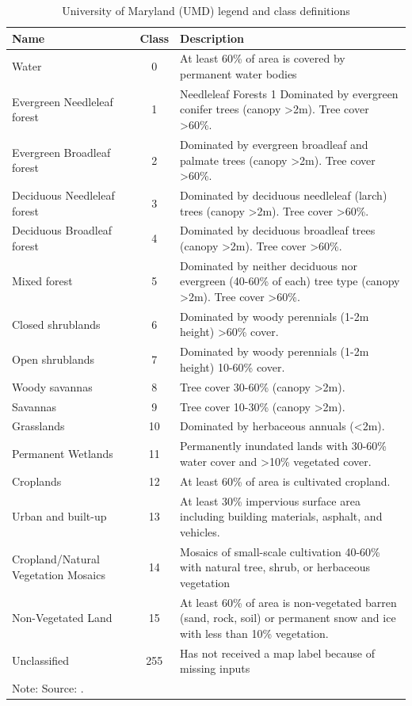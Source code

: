 \begin{table}[H]
\footnotesize
\caption{University of Maryland (UMD) legend and class definitions}
\begin{tabularx}{\textwidth}{l c X}
\hline
\hline
Name & Class & \centering\arraybackslash Description\\
\hline
Water	&	0	&	At least 60\% of area is covered by permanent water bodies	\\
Evergreen Needleleaf forest	&	1	&	Needleleaf Forests 1 Dominated by evergreen conifer trees (canopy >2m). Tree cover >60\%.	\\
Evergreen Broadleaf forest	&	2	&	Dominated by evergreen broadleaf and palmate trees (canopy >2m). Tree cover >60\%.	\\
Deciduous Needleleaf forest	&	3	&	Dominated by deciduous needleleaf (larch) trees (canopy >2m). Tree cover >60\%.	\\
Deciduous Broadleaf forest	&	4	&	Dominated by deciduous broadleaf trees (canopy >2m). Tree cover >60\%.	\\
Mixed forest	&	5	&	Dominated by neither deciduous nor evergreen (40-60\% of each) tree type (canopy >2m). Tree cover >60\%.	\\
Closed shrublands	&	6	&	Dominated by woody perennials (1-2m height) >60\% cover.	\\
Open shrublands	&	7	&	 Dominated by woody perennials (1-2m height) 10-60\% cover.	\\
Woody savannas	&	8	&	Tree cover 30-60\% (canopy >2m).	\\
Savannas	&	9	&	Tree cover 10-30\% (canopy >2m).	\\
Grasslands	&	10	&	 Dominated by herbaceous annuals (<2m).	\\
Permanent Wetlands	&	11	&	Permanently inundated lands with 30-60\% water cover and >10\% vegetated cover.	\\
Croplands	&	12	&	At least 60\% of area is cultivated cropland.	\\
Urban and built-up	&	13	&	At least 30\% impervious surface area including building materials, asphalt, and vehicles.	\\
Cropland/Natural Vegetation Mosaics	&	14	&	Mosaics of small-scale cultivation 40-60\% with natural tree, shrub, or herbaceous vegetation	\\
Non-Vegetated Land	&	15	&	At least 60\% of area is non-vegetated barren (sand, rock, soil) or permanent snow and ice with less than 10\% vegetation.	\\
Unclassified	&	255	&	 Has not received a map label because of missing inputs	\\
\hline
\hline
\multicolumn{3}{l}{\footnotesize  Note: Source: \cite{sulla2_2018}.}
\end{tabularx}
\label{UMD2}
\end{table}

